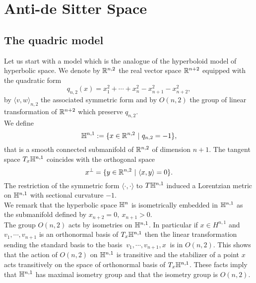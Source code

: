 \chapter{Anti-de Sitter Space} \label{chapter:2}

\section{The quadric model}
Let us start with a model which is the analogue of the hyperboloid model of hyperbolic space. We denote by $\mathbb{R} ^{n,2}$ the real vector space $\mathbb{R} ^{n+2}$ equipped with the quadratic form
\[
q_{n,2}(x) = x_1^2 + \cdots + x_n^2 - x_{n+1}^2 - x_{n+2}^2,
\]
by $\langle v,w \rangle_{n,2}$ the associated symmetric form and by $O(n,2)$ the group of linear transformation of $\mathbb{R}^{n+2}$ which preserve $q_{n,2}$.\\
We define
\[
\mathbb{H}^{n,1} := \{ x\in \mathbb{R}^{n,2} \ | \ q_{n,2} = -1 \},
\]
that is a smooth connected submanifold of $\mathbb{R}^{n,2}$ of dimension $n+1$. The tangent space $T_x \mathbb{H}^{n,1}$ coincides with the orthogonal space
\[
x^\perp = \{ y\in\mathbb{R}^{n,2} \ | \ \langle x,y \rangle=0 \}.
\]
The restriction of the symmetric form $\langle \cdot , \cdot \rangle$ to $T\mathbb{H}^{n,1}$ induced a Lorentzian metric on $\mathbb{H}^{n,1}$ with sectional curvature $-1$.\\
We remark that the hyperbolic space $\mathbb{H}^n$ is isometrically embedded in $\mathbb{H}^{n,1}$ as the submanifold defined by $x_{n+2}=0,\ x_{n+1}>0$.\\
The group $O(n,2)$ acts by isometries on $\mathbb{H}^{n,1}$. In particular if $x\in H^{n,1}$ and $v_1, \cdots , v_{n+1}$ is an orthonormal basis of $T_x \mathbb{H}^{n,1}$ then the linear transformation sending the standard basis to the basis $\ v_1,\cdots,v_{n+1},x \ $ is in $O(n,2)$. This shows that the action of $O(n,2)$ on $\mathbb{H}^{n,1}$ is transitive and the stabilizer of a point $x$ acts transitively on the space of orthonormal basis of $T_x\mathbb{H}^{n,1}$. 
These facts imply that $\mathbb{H}^{n,1}$ has maximal isometry group and that the isometry group is $O(n,2)$.\\


